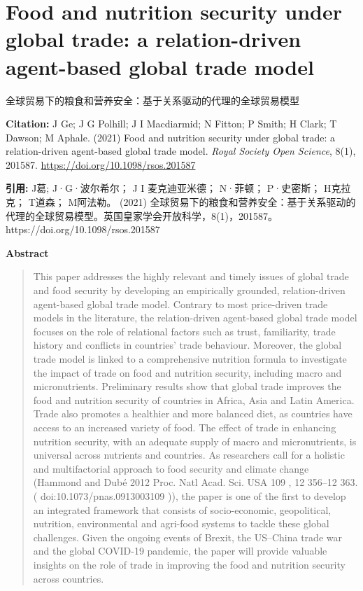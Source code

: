 \vspace{0.5em}


\chapter{Food and nutrition security under global trade: a relation-driven agent-based global trade model}
\begin{center}\small 全球贸易下的粮食和营养安全：基于关系驱动的代理的全球贸易模型\end{center}

\noindent\textbf{Citation:} J Ge; J G Polhill; J I Macdiarmid; N Fitton; P Smith; H Clark; T Dawson; M Aphale. (2021) Food and nutrition security under global trade: a relation-driven agent-based global trade model. \textit{Royal Society Open Science}, 8(1), 201587. \url{https://doi.org/10.1098/rsos.201587}

\vspace{0.5em}
\noindent\textbf{引用:} J葛; J·G·波尔希尔； J I 麦克迪亚米德； N·菲顿； P·史密斯； H克拉克； T道森； M阿法勒。 (2021) 全球贸易下的粮食和营养安全：基于关系驱动的代理的全球贸易模型。英国皇家学会开放科学，8(1)，201587。https://doi.org/10.1098/rsos.201587

\vspace{1.5em}
\noindent\textbf{Abstract}\par
\begin{quote}\small
This paper addresses the highly relevant and timely issues of global trade and food security by developing an empirically grounded, relation-driven agent-based global trade model. Contrary to most price-driven trade models in the literature, the relation-driven agent-based global trade model focuses on the role of relational factors such as trust, familiarity, trade history and conflicts in countries' trade behaviour. Moreover, the global trade model is linked to a comprehensive nutrition formula to investigate the impact of trade on food and nutrition security, including macro and micronutrients. Preliminary results show that global trade improves the food and nutrition security of countries in Africa, Asia and Latin America. Trade also promotes a healthier and more balanced diet, as countries have access to an increased variety of food. The effect of trade in enhancing nutrition security, with an adequate supply of macro and micronutrients, is universal across nutrients and countries. As researchers call for a holistic and multifactorial approach to food security and climate change (Hammond and Dubé 2012 Proc. Natl Acad. Sci. USA 109 , 12 356–12 363. ( doi:10.1073/pnas.0913003109 )), the paper is one of the first to develop an integrated framework that consists of socio-economic, geopolitical, nutrition, environmental and agri-food systems to tackle these global challenges. Given the ongoing events of Brexit, the US–China trade war and the global COVID-19 pandemic, the paper will provide valuable insights on the role of trade in improving the food and nutrition security across countries.
\end{quote}

